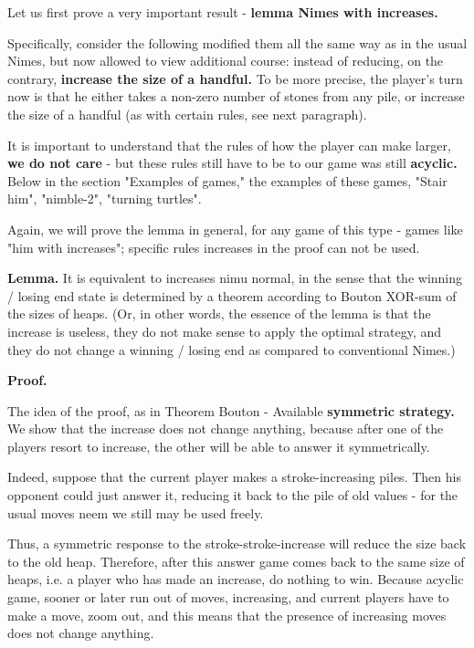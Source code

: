 Let us first prove a very important result - \textbf{lemma Nimes with increases.}

Specifically, consider the following modified them all the same way as in the usual Nimes, but now allowed to view additional course: instead of reducing, on the contrary, \textbf{increase the size of a handful.} To be more precise, the player's turn now is that he either takes a non-zero number of stones from any pile, or increase the size of a handful (as with certain rules, see next paragraph).

It is important to understand that the rules of how the player can make larger, \textbf{we do not care} - but these rules still have to be to our game was still \textbf{acyclic.} Below in the section "Examples of games," the examples of these games, "Stair him", "nimble-2", "turning turtles".

Again, we will prove the lemma in general, for any game of this type - games like "him with increases"; specific rules increases in the proof can not be used.

\textbf{Lemma.} It is equivalent to increases nimu normal, in the sense that the winning / losing end state is determined by a theorem according to Bouton XOR-sum of the sizes of heaps. (Or, in other words, the essence of the lemma is that the increase is useless, they do not make sense to apply the optimal strategy, and they do not change a winning / losing end as compared to conventional Nimes.)

\textbf{Proof.}

The idea of the proof, as in Theorem Bouton - Available \textbf{symmetric strategy.} We show that the increase does not change anything, because after one of the players resort to increase, the other will be able to answer it symmetrically.

Indeed, suppose that the current player makes a stroke-increasing piles. Then his opponent could just answer it, reducing it back to the pile of old values ​​- for the usual moves neem we still may be used freely.

Thus, a symmetric response to the stroke-stroke-increase will reduce the size back to the old heap. Therefore, after this answer game comes back to the same size of heaps, i.e. a player who has made an increase, do nothing to win. Because acyclic game, sooner or later run out of moves, increasing, and current players have to make a move, zoom out, and this means that the presence of increasing moves does not change anything.

